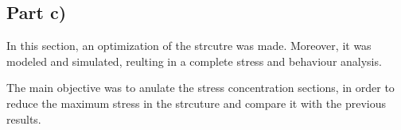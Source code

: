 \subsection{Part c)}

In this section, an optimization of the strcutre was made. Moreover, it was modeled and simulated, reulting in a complete stress and behaviour analysis.

The main objective was to anulate the stress concentration sections, in order to reduce the maximum stress in the strcuture and compare it with the previous results.

